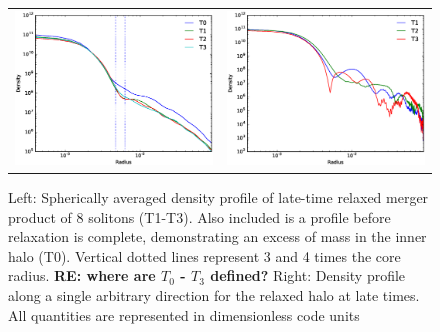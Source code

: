 \documentclass[a4paper,11pt]{article}
\newcommand{\re}[1]{{{\bf \color{green} RE: #1}}}
\begin{document}
\begin{figure}
\begin{tabular}{cc}
{\includegraphics[scale = 0.42, trim={1.5cm 0 0 1cm}]{pics/M_combined_2.eps}} &
{\includegraphics[scale = 0.42, trim={2.5cm 0 0 1cm}]{pics/M_singles_1.eps}}
\end{tabular}
\caption{Left: Spherically averaged density profile of late-time relaxed merger product of 8 solitons (T1-T3). Also included is a profile before relaxation is complete, demonstrating an excess of mass in the inner halo (T0). Vertical dotted lines represent 3 and 4 times the core radius. \re{where are $T_0$ - $T_3$ defined? }  
Right: Density profile along a single arbitrary direction for the relaxed halo at late times. All quantities are represented in dimensionless code units}\label{fig:pul}
\end{figure}
\end{document}
